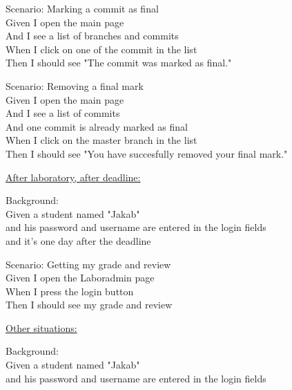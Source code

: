Scenario: Marking a commit as final\\ \hspace*{1cm}
Given I open the main page\\ \hspace*{1cm}
And I see a list of branches and commits\\ \hspace*{1cm}
When I click on one of the commit in the list\\ \hspace*{1cm}
Then I should see "The commit was marked as final."

Scenario: Removing a final mark\\ \hspace*{1cm}
Given I open the main page\\ \hspace*{1cm}
And I see a list of commits\\ \hspace*{1cm}
And one commit is already marked as final\\ \hspace*{1cm}
When I click on the master branch in the list\\ \hspace*{1cm}
Then I should see "You have succesfully removed your final mark."



\underline{After laboratory, after deadline:}

Background:\\ \hspace*{1cm}
Given a student named "Jakab"\\ \hspace*{1cm}
and his password and username are entered in the login fields\\ \hspace*{1cm}
and it's one day after the deadline

Scenario: Getting my grade and review\\ \hspace*{1cm}
Given I open the Laboradmin page\\ \hspace*{1cm}
When I press the login button\\ \hspace*{1cm}
Then I should see my grade and review



\underline{Other situations:}

Background:\\ \hspace*{1cm}
Given a student named "Jakab"\\ \hspace*{1cm}
and his password and username are entered in the login fields

